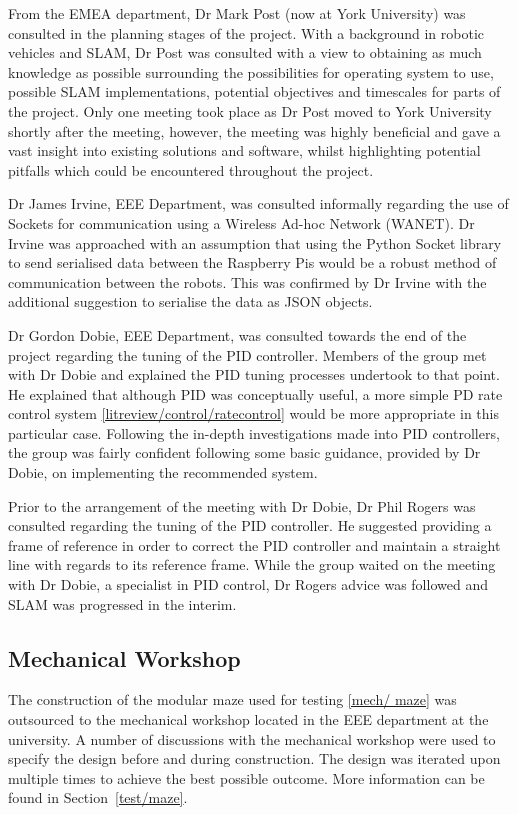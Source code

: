 From the EMEA department, Dr Mark Post (now at York University) 
was consulted in the planning stages of the project. With a 
background in robotic vehicles and SLAM, Dr Post was consulted 
with a view to obtaining as much knowledge as possible 
surrounding the possibilities for operating system to use, 
possible SLAM implementations, potential objectives and 
timescales for parts of the project. Only one meeting took place 
as Dr Post moved to York University shortly after the meeting, 
however, the meeting was highly beneficial and gave a vast 
insight into existing solutions and software, whilst highlighting 
potential pitfalls which could be encountered throughout 
the project.

Dr James Irvine, EEE Department, was consulted informally  
regarding the use of Sockets for communication using a Wireless 
Ad-hoc Network (WANET). Dr Irvine was approached with an 
assumption that using the Python Socket library to send 
serialised data between the Raspberry Pis would be a robust 
method of communication between the robots. This was confirmed 
by Dr Irvine with the additional suggestion to serialise the data
as JSON objects. 


Dr Gordon Dobie, EEE Department, was consulted towards the end 
of the project regarding the tuning of the PID controller. 
Members of the group met with Dr Dobie and explained the PID tuning 
processes undertook to that point. He explained that although 
PID was conceptually useful, a more simple PD rate control system 
\ref{litreview/control/ratecontrol} would be more appropriate 
in this particular case. Following the in-depth investigations made 
into PID controllers, the group was fairly confident following some 
basic guidance, provided by Dr Dobie, on implementing the 
recommended system. 

Prior to the arrangement of the meeting with Dr Dobie, Dr Phil 
Rogers was consulted regarding the tuning of the PID controller. 
He suggested providing a frame of reference in order to correct 
the PID controller and maintain a straight line with regards to 
its reference frame. While the group waited on the meeting with 
Dr Dobie, a specialist in PID control, Dr Rogers advice was 
followed and SLAM was progressed in the interim.   

\subsection{Mechanical Workshop}\label{pm/mechshop}
The construction of the modular maze used for testing \ref{mech/
maze} was outsourced to the mechanical workshop located in the 
EEE department at the university. A number of discussions with 
the mechanical workshop were used to specify the design  
before and during construction. The design was iterated upon multiple times to achieve the best 
possible outcome. More information can be found in Section~\ref{test/maze}.  

